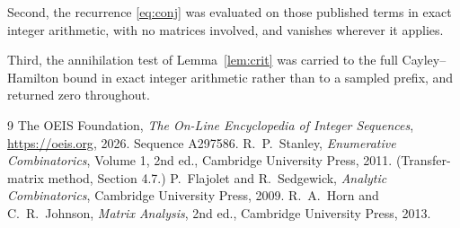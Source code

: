 \documentclass[11pt,a4paper]{article}
\theoremstyle{plain}
\theoremstyle{definition}
\begin{document}
Second, the recurrence \eqref{eq:conj} was evaluated on those published terms in exact
integer arithmetic, with no matrices involved, and vanishes wherever it applies.

Third, the annihilation test of Lemma~\ref{lem:crit} was carried to the full
Cayley--Hamilton bound in exact integer arithmetic rather than to a sampled prefix, and
returned zero throughout.

\begin{thebibliography}{9}
 The OEIS Foundation, \emph{The On-Line Encyclopedia of Integer
Sequences}, \url{https://oeis.org}, 2026. Sequence A297586.
 R.~P.~Stanley, \emph{Enumerative Combinatorics}, Volume 1, 2nd ed.,
Cambridge University Press, 2011. (Transfer-matrix method, Section 4.7.)
 P.~Flajolet and R.~Sedgewick, \emph{Analytic Combinatorics}, Cambridge
University Press, 2009.
 R.~A.~Horn and C.~R.~Johnson, \emph{Matrix Analysis}, 2nd ed., Cambridge
University Press, 2013.
\end{thebibliography}
\end{document}
